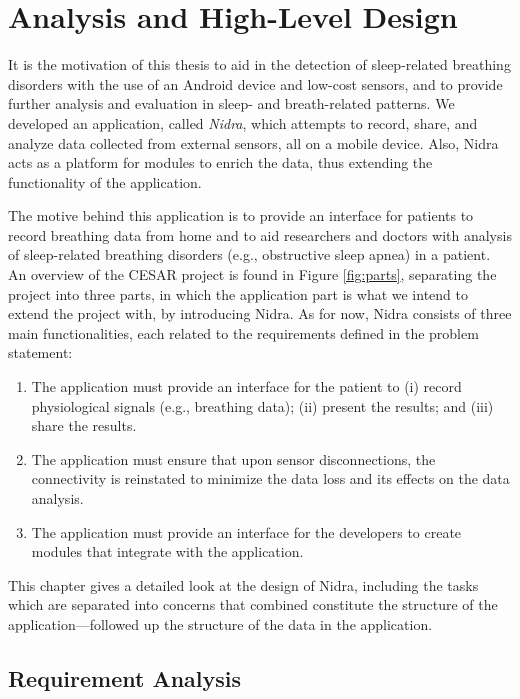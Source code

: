 
\chapter{Analysis and High-Level Design}

It is the motivation of this thesis to aid in the detection of sleep-related breathing disorders with the use of an Android device and low-cost sensors, and to provide further analysis and evaluation in sleep- and breath-related patterns. We developed an application, called \textit{Nidra}, which attempts to record, share, and analyze data collected from external sensors, all on a mobile device. Also, Nidra acts as a platform for modules to enrich the data, thus extending the functionality of the application.

The motive behind this application is to provide an interface for patients to record breathing data from home and to aid researchers and doctors with analysis of sleep-related breathing disorders (e.g., obstructive sleep apnea) in a patient. An overview of the CESAR project is found in Figure \ref{fig:parts}, separating the project into three parts, in which the application part is what we intend to extend the project with, by introducing Nidra. As for now, Nidra consists of three main functionalities, each related to the requirements defined in the problem statement:  

\begin{enumerate}
    \item The application must provide an interface for the patient to (i) record physiological signals (e.g., breathing data); (ii) present the results; and (iii) share the results.
    \item The application must ensure that upon sensor disconnections, the connectivity is reinstated to minimize the data loss and its effects on the data analysis.
    \item The application must provide an interface for the developers to create modules that integrate with the application.
\end{enumerate}

This chapter gives a detailed look at the design of Nidra, including the tasks which are separated into concerns that combined constitute the structure of the application---followed up the structure of the data in the application.

\section{Requirement Analysis}

